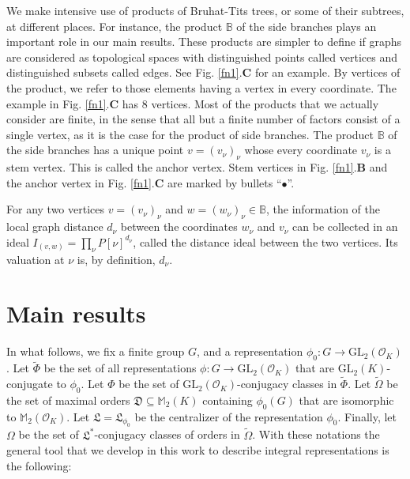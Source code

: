 \documentclass{article}
\theoremstyle{definition}
\theoremstyle{remark}
\begin{document}
We make intensive use of products of Bruhat-Tits trees,
or some of their subtrees, at different places.
For instance, the product $\mathbb{B}$ of the side
branches plays an important role in our main results.
These products are simpler to define if graphs
are considered as topological spaces with distinguished points
called vertices and distinguished subsets called edges.
See Fig. \ref{fn1}.\textbf{C} for an example. 
By vertices of the product, we refer
to those elements having a vertex in every coordinate.
The example in Fig. \ref{fn1}.\textbf{C} has 8 vertices.
Most of the products that we actually consider are finite,
in the sense that all but a finite number of factors
consist of a single vertex, as it is the case for the product
of side branches. The product $\mathbb{B}$ of the side
branches has a unique point $v=(v_\nu)_\nu$ whose every 
coordinate $v_\nu$ is a stem vertex.
This is called the anchor vertex.
Stem vertices in Fig. \ref{fn1}.\textbf{B} and the anchor 
vertex in Fig. \ref{fn1}.\textbf{C} are marked by
bullets ``$\bullet$''.

For any two vertices $v=(v_\nu)_\nu$ and
$w=(w_\nu)_\nu\in\mathbb{B}$, the information 
of the local graph distance $d_\nu$ between the coordinates
$w_\nu$ and $v_\nu$ can be collected in an ideal 
$I_{(v,w)}=\prod_\nu P[\nu]^{d_\nu}$,
called the distance ideal between the two vertices.
Its valuation at $\nu$ is, by definition, $d_\nu$.

\section{Main results}\label{MR}

In what follows, we fix a finite group $G$, and a 
representation $\phi_0:G\rightarrow
\mathrm{GL}_2(\mathcal{O}_K)$. Let $\tilde{\Phi}$ be the set 
of all representations $\phi:G\rightarrow
\mathrm{GL}_2(\mathcal{O}_K)$ that are 
$\mathrm{GL}_2(K)$-conjugate to $\phi_0$. Let $\Phi$ be the set
of $\mathrm{GL}_2(\mathcal{O}_K)$-conjugacy classes in
$\tilde{\Phi}$. Let $\tilde{\Omega}$ be the set of
maximal orders $\mathfrak{D}\subseteq\mathbb{M}_2(K)$ 
containing $\phi_0(G)$ that are isomorphic to
$\mathbb{M}_2(\mathcal{O}_K)$. Let
$\mathfrak{L}=\mathfrak{L}_{\phi_0}$ be the centralizer of the
representation $\phi_0$. Finally, let $\Omega$ be the set 
 of $\mathfrak{L}^*$-conjugacy classes of orders 
in $\tilde{\Omega}$. With these notations the general tool 
that we develop in this work to describe integral 
representations is the following:
\end{document}
